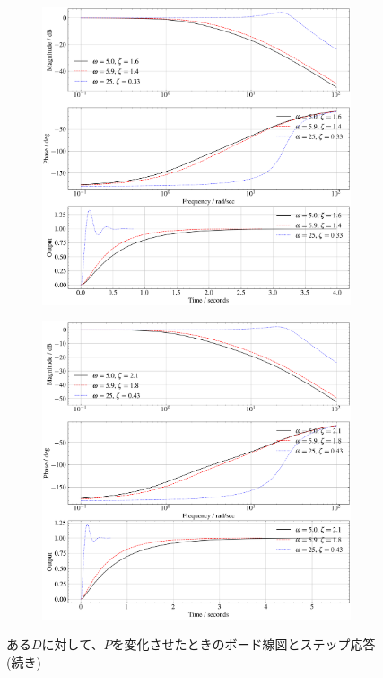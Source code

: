 \begin{figure}
    \addtocounter{figure}{-1}
    \centering
    \begin{subfigure}{0.8\linewidth}
        \setcounter{subfigure}{2}
        \centering
        \includegraphics[width=0.8\linewidth]{src/figures/bode-phase-step-ideal-group-real/bode-phase-step-ideal-group-real-3.png}
        \label{fig:bode-phase-step-ideal-group-real-d-80}
    \end{subfigure}
    \begin{subfigure}{0.8\linewidth}
        \centering
        \includegraphics[width=0.8\linewidth]{src/figures/bode-phase-step-ideal-group-real/bode-phase-step-ideal-group-real-4.png}
        \label{fig:bode-phase-step-ideal-group-real-d-100}
    \end{subfigure}
    \caption{ある$D$に対して、$P$を変化させたときのボード線図とステップ応答(続き)}
\end{figure}
